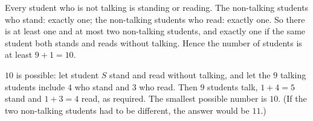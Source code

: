 Every student who is not talking is standing or reading. The non-talking students who stand: exactly one; the non-talking students who read: exactly one. So there is at least one and at most two non-talking students, and exactly one if the same student both stands and reads without talking. Hence the number of students is at least $9+1=10$.

$10$ is possible: let student $S$ stand and read without talking, and let the $9$ talking students include $4$ who stand and $3$ who read. Then $9$ students talk, $1+4=5$ stand and $1+3=4$ read, as required. The smallest possible number is $\boxed{10}$. (If the two non-talking students had to be different, the answer would be $11$.)
